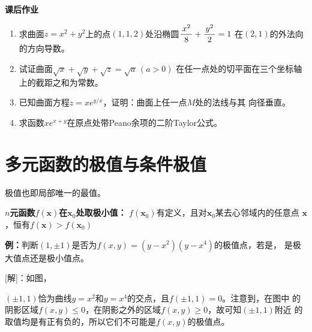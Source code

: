 
\begin{ext}
	{\bf 课后作业}
	\begin{enumerate}
	  \item 求曲面$z=x^2+y^2$上的点$(1,1,2)$处沿椭圆$\displaystyle\frac{\,{x^2}\,}{\,{8}\,}+\displaystyle\frac{\,{y^2}\,}{\,{2}\,}=1$
	  在$(2,1)$的外法向的方向导数。
	  \item 试证曲面$\sqrt{x}+\sqrt y+\sqrt z=\sqrt a\,(a>0)$
	  在任一点处的切平面在三个坐标轴上的截距之和为常数。
	  \item 已知曲面方程$z=xe^{y/x}$，证明：曲面上任一点$M$处的法线与其
	  向径垂直。
	  \item 求函数$xe^{x+y}$在原点处带Peano余项的二阶Taylor公式。
	\end{enumerate}
\end{ext}

\section{多元函数的极值与条件极值}

{\kaishu 极值}也即局部唯一的最值。
\begin{thx}
	{\bf $n$元函数$f(\bm{x})$在$\bm{x}_0$处取极小值：}
	$f(\bm{x}_0)$有定义，且对$\bm{x}_0$某去心邻域内的任意点
	$\bm{x}$，恒有$f(\bm{x})>f(\bm{x}_0)$
\end{thx}

{\bf 例：}判断$(1,\pm1)$是否为$f(x,y)=(y-x^2)(y-x^4)$的极值点，若是，
是极大值点还是极小值点。

[解]：如图，
\begin{center}
\end{center}
$(\pm1,1)$恰为曲线$y=x^2$和$y=x^4$的交点，且$f(\pm1,1)=0$。注意到，在图中
的阴影区域$f(x,y)\leq0$，在阴影之外的区域$f(x,y)\geq0$，故可知$(\pm1,1)$附近
的取值均是有正有负的，所以它们不可能是$f(x,y)$的极值点。\fin

